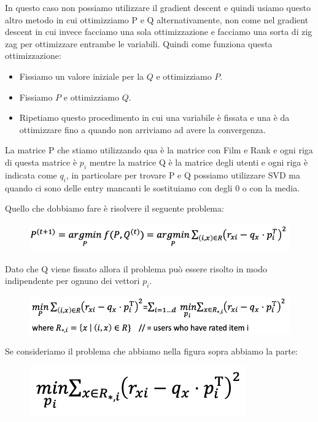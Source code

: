 \documentclass[14pt]{extreport}
\begin{document}
In questo caso non possiamo utilizzare il gradient descent e quindi usiamo questo altro metodo in cui ottimizziamo P e Q alternativamente, non come nel gradient descent
in cui invece facciamo una sola ottimizzazione e facciamo una sorta di zig zag per ottimizzare entrambe le variabili.
Quindi come funziona questa ottimizzazione: 
\begin{itemize}
	\item Fissiamo un valore iniziale per la $Q$ e ottimizziamo $P$.
	\item Fissiamo $P$ e ottimizziamo $Q$.
	\item Ripetiamo questo procedimento in cui una variabile è fissata e una è da ottimizzare fino a quando non arriviamo ad avere la convergenza.
\end{itemize}

La matrice P che stiamo utilizzando qua è la matrice con Film e Rank e ogni riga di questa matrice è $p_i$ 
mentre la matrice Q è la matrice degli utenti e ogni riga è indicata come $q_i$, in particolare per trovare P e Q
possiamo utilizzare SVD ma quando ci sono delle entry mancanti le sostituiamo con degli 0 o con la media.

Quello che dobbiamo fare è risolvere il seguente problema:

\begin{figure}[H] 
\centering
\includegraphics[width=0.7\linewidth]{517.jpeg}
\end{figure}

Dato che Q viene fissato allora il problema può essere risolto in modo indipendente per ognuno dei vettori $p_i$.

\begin{figure}[H] 
\centering
\includegraphics[width=0.7\linewidth]{518.jpeg}
\end{figure}

Se consideriamo il problema che abbiamo nella figura sopra abbiamo la parte:


\begin{figure}[H] 
\centering
\includegraphics[width=0.7\linewidth]{519.jpeg}
\end{figure}
\end{document}
